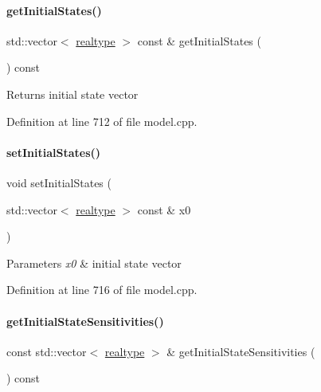 \paragraph{\texorpdfstring{getInitialStates()}{getInitialStates()}}
{\footnotesize\ttfamily std\+::vector$<$ \mbox{\hyperlink{namespaceamici_a1bdce28051d6a53868f7ccbf5f2c14a3}{realtype}} $>$ const  \& get\+Initial\+States (\begin{DoxyParamCaption}{ }\end{DoxyParamCaption}) const}

\begin{DoxyReturn}{Returns}
initial state vector 
\end{DoxyReturn}


Definition at line 712 of file model.\+cpp.

\mbox{\label{classamici_1_1_model_ada7cb3dadf4cee4b8fd6f092fee54b3c}} 
\paragraph{\texorpdfstring{setInitialStates()}{setInitialStates()}}
{\footnotesize\ttfamily void set\+Initial\+States (\begin{DoxyParamCaption}\item[{std\+::vector$<$ \mbox{\hyperlink{namespaceamici_a1bdce28051d6a53868f7ccbf5f2c14a3}{realtype}} $>$ const \&}]{x0 }\end{DoxyParamCaption})}


\begin{DoxyParams}{Parameters}
{\em x0} & initial state vector \\
\hline
\end{DoxyParams}


Definition at line 716 of file model.\+cpp.

\mbox{\label{classamici_1_1_model_a989b8202ceac7b6f94bb1503519a56fb}} 
\paragraph{\texorpdfstring{getInitialStateSensitivities()}{getInitialStateSensitivities()}}
{\footnotesize\ttfamily const std\+::vector$<$ \mbox{\hyperlink{namespaceamici_a1bdce28051d6a53868f7ccbf5f2c14a3}{realtype}} $>$ \& get\+Initial\+State\+Sensitivities (\begin{DoxyParamCaption}{ }\end{DoxyParamCaption}) const}

